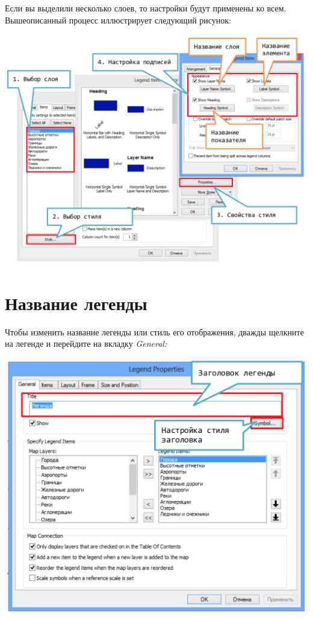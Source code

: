 \documentclass[12pt,]{book}
\begin{document}
Если вы выделили несколько слоев, то настройки будут применены ко всем. Вышеописанный процесс иллюстрирует следующий рисунок:

\includegraphics{images/Appendix/image59.png}

\hypertarget{section-59}{%
\section{Название легенды}\label{section-59}}

Чтобы изменить название легенды или стиль его отображения, дважды щелкните на легенде и перейдите на вкладку \emph{General:}

\includegraphics{images/Appendix/image60.png}
\end{document}
